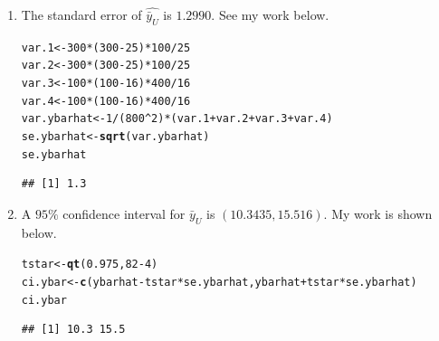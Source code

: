 \documentclass[12pt]{article}\usepackage[]{graphicx}\usepackage[]{color}
\makeatletter
\newcommand{\hlnum}[1]{\textcolor[rgb]{0.686,0.059,0.569}{#1}}%
\newcommand{\hlopt}[1]{\textcolor[rgb]{0,0,0}{#1}}%
\newcommand{\hlstd}[1]{\textcolor[rgb]{0.345,0.345,0.345}{#1}}%
\newcommand{\hlkwb}[1]{\textcolor[rgb]{0.69,0.353,0.396}{#1}}%
\newcommand{\hlkwd}[1]{\textcolor[rgb]{0.737,0.353,0.396}{\textbf{#1}}}%
\newenvironment{kframe}{%
 \def\at@end@of@kframe{}%
 \ifinner\ifhmode%
  \def\at@end@of@kframe{\end{minipage}}%
  \begin{minipage}{\columnwidth}%
 \fi\fi%
 \def\FrameCommand##1{\hskip\@totalleftmargin \hskip-\fboxsep
 \colorbox{shadecolor}{##1}\hskip-\fboxsep
     \hskip-\linewidth \hskip-\@totalleftmargin \hskip\columnwidth}%
 \MakeFramed {\advance\hsize-\width
   \@totalleftmargin\z@ \linewidth\hsize
   \@setminipage}}%
 {\par\unskip\endMakeFramed%
 \at@end@of@kframe}
\newenvironment{knitrout}{}{} %
\makeatother
\begin{document}
\begin{doublespacing}
\begin{enumerate}
\begin{enumerate}
\item The standard error of $\widehat{\bar{y}_U}$ is $1.2990$. See my work below.

\begin{singlespace}
\begin{knitrout}\footnotesize
{}\color{fgcolor}\begin{kframe}
\begin{alltt}
\hlstd{var.1} \hlkwb{<-} \hlnum{300}\hlopt{*}\hlstd{(}\hlnum{300}\hlopt{-}\hlnum{25}\hlstd{)}\hlopt{*}\hlnum{100}\hlopt{/}\hlnum{25}
\hlstd{var.2} \hlkwb{<-} \hlnum{300}\hlopt{*}\hlstd{(}\hlnum{300}\hlopt{-}\hlnum{25}\hlstd{)}\hlopt{*}\hlnum{100}\hlopt{/}\hlnum{25}
\hlstd{var.3} \hlkwb{<-} \hlnum{100}\hlopt{*}\hlstd{(}\hlnum{100}\hlopt{-}\hlnum{16}\hlstd{)}\hlopt{*}\hlnum{400}\hlopt{/}\hlnum{16}
\hlstd{var.4} \hlkwb{<-} \hlnum{100}\hlopt{*}\hlstd{(}\hlnum{100}\hlopt{-}\hlnum{16}\hlstd{)}\hlopt{*}\hlnum{400}\hlopt{/}\hlnum{16}
\hlstd{var.ybarhat} \hlkwb{<-} \hlnum{1}\hlopt{/}\hlstd{(}\hlnum{800}\hlopt{^}\hlnum{2}\hlstd{)}\hlopt{*}\hlstd{(var.1}\hlopt{+}\hlstd{var.2}\hlopt{+}\hlstd{var.3}\hlopt{+}\hlstd{var.4)}
\hlstd{se.ybarhat} \hlkwb{<-} \hlkwd{sqrt}\hlstd{(var.ybarhat)}
\hlstd{se.ybarhat}
\end{alltt}
\begin{verbatim}
## [1] 1.3
\end{verbatim}
\end{kframe}
\end{knitrout}
\end{singlespace}

\item A $95\%$ confidence interval for $\bar{y}_{U}$ is $(10.3435, 15.516)$. My work is shown below.

\begin{singlespace}
\begin{knitrout}\footnotesize
{}\color{fgcolor}\begin{kframe}
\begin{alltt}
\hlstd{tstar} \hlkwb{<-} \hlkwd{qt}\hlstd{(}\hlnum{0.975}\hlstd{,} \hlnum{82}\hlopt{-}\hlnum{4}\hlstd{)}
\hlstd{ci.ybar} \hlkwb{<-} \hlkwd{c}\hlstd{(ybarhat}\hlopt{-}\hlstd{tstar}\hlopt{*}\hlstd{se.ybarhat, ybarhat}\hlopt{+}\hlstd{tstar}\hlopt{*}\hlstd{se.ybarhat)}
\hlstd{ci.ybar}
\end{alltt}
\begin{verbatim}
## [1] 10.3 15.5
\end{verbatim}
\end{kframe}
\end{knitrout}
\end{singlespace}


\end{enumerate}
\end{enumerate}
\end{doublespacing}
\end{document}
